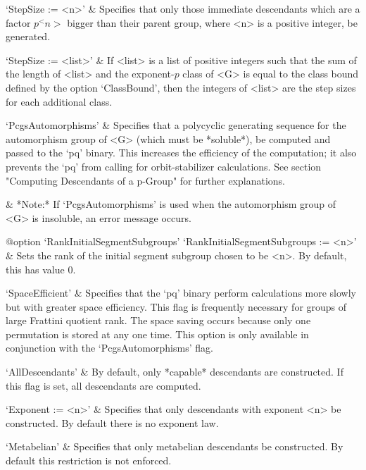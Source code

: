 `StepSize := <n>' &
Specifies that only  those  immediate  descendants  which  are  a  factor
$p^<n>$ bigger than their parent group, where <n> is a positive  integer,
be generated.

`StepSize := <list>' &
If <list> is a list of positive integers such that the sum of the  length
of <list> and the exponent-$p$ class of <G> is equal to the  class  bound
defined by the option `ClassBound', then the integers of <list>  are  the
step sizes for each additional class.

`PcgsAutomorphisms' &
Specifies that a polycyclic  generating  sequence  for  the  automorphism
group of <G> (which must be *soluble*), be computed  and  passed  to  the
`pq' binary. This increases the efficiency of the  computation;  it  also
prevents the `pq' from calling {\GAP} for orbit-stabilizer  calculations.
See  section  "Computing  Descendants   of   a   p-Group"   for   further
explanations.

&
*Note:*
If `PcgsAutomorphisms' is used when the  automorphism  group  of  <G>  is
insoluble, an error message occurs.

%
{@option \noexpand`RankInitialSegmentSubgroups'}
`RankInitialSegmentSubgroups := <n>' &
Sets the rank of the initial  segment  subgroup  chosen  to  be  <n>.  By
default, this has value 0.

`SpaceEfficient' &
Specifies that the `pq' binary perform calculations more slowly but  with
greater space efficiency. This flag is frequently necessary for groups of
large Frattini quotient rank. The space saving occurs  because  only  one
permutation is stored at any one time. This option is only  available  in
conjunction with the `PcgsAutomorphisms' flag.

`AllDescendants' &
By default, only *capable* descendants are constructed. If this  flag  is
set, all descendants are computed.

`Exponent := <n>' &
Specifies that only descendants with  exponent  <n>  be  constructed.  By
default there is no exponent law.

`Metabelian' &
Specifies that only metabelian descendants  be  constructed.  By  default
this restriction is not enforced.

